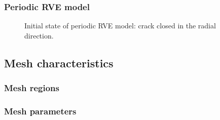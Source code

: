 \documentclass[first,firstsupp,lastsupp,handout,last,hyperref,table]{ETHclass}
\begin{document}
\begin{frame}
\frametitle{Periodic RVE model}
\vspace{-0.75cm}
\centering
\begin{figure}[!h]
\centering
  \caption{\scriptsize Initial state of periodic RVE model: crack closed in the radial direction.}
  \label{fig:periodicRVE_onlycc}
\end{figure}
\end{frame}

%

%

%


\subsection{Mesh characteristics}


\begin{frame}
\frametitle{Mesh regions}
\vspace{-0.75cm}
\centering
\begin{figure}[!h]
\centering
  \label{fig:mesh_regions}
\end{figure}
\end{frame}


\begin{frame}
\frametitle{Mesh parameters}
\vspace{-0.75cm}
\centering
\begin{figure}[!h]
\centering
  \label{fig:mesh_param_single}
\end{figure}
\end{frame}
\end{document}
